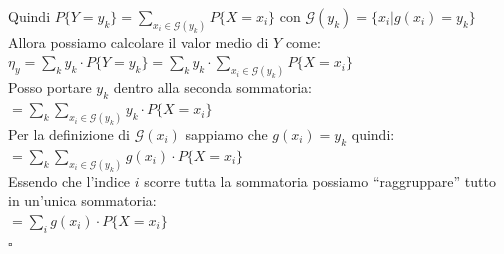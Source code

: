\documentclass{article}
\begin{document}
Quindi $P\big\{ Y = y_k \big\} = \sum_{x_i \in \mathcal{G}(y_k)} P \big\{ X = x_i \big\}$ con $\mathcal{G}(y_k) = \big\{ x_i \big| g(x_i) = y_k\big\}$ \\
Allora possiamo calcolare il valor medio di $Y$ come: $\eta_y = \sum_{k} y_k \cdot P\big\{ Y=y_k\big\} = \sum_{k} y_k \cdot \sum_{x_i \in \mathcal{G}(y_k)} P\big\{ X=x_i\big\}$ \\
Posso portare $y_k$ dentro alla seconda sommatoria: \\
$= \sum_{k} \sum_{x_i \in \mathcal{G}(y_k)} y_k \cdot P\big\{ X=x_i\big\}$ \\
Per la definizione di $\mathcal{G}(x_i)$ sappiamo che $g(x_i) = y_k$ quindi: \\
$= \sum_{k} \sum_{x_i \in \mathcal{G}(y_k)} g(x_i) \cdot P\big\{ X=x_i\big\}$ \\
Essendo che l’indice $i$ scorre tutta la sommatoria possiamo “raggruppare” tutto in un’unica sommatoria: \\
$= \sum_{i} g(x_i) \cdot P\big\{ X=x_i\big\}$ \\
\hspace*{0pt}\hfill $\square$ 
\end{document}
